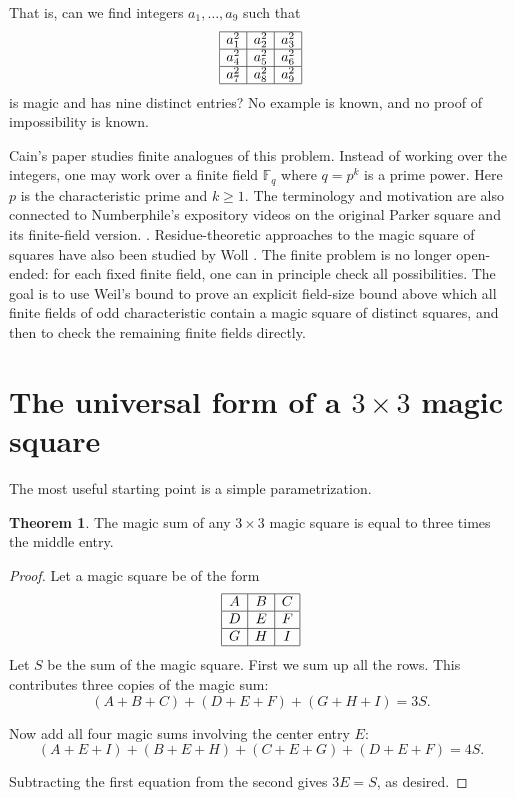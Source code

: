 \documentclass{article}
\newcommand{\F}{\mathbb F}
\theoremstyle{definition}
\newtheorem{theorem}{Theorem}
\numberwithin{equation}{section}
\begin{document}
That is, can we find integers \(a_1,\dots,a_9\) such that
\[
\begin{array}{|c|c|c|}
\hline
a_1^2&a_2^2&a_3^2\\
\hline
a_4^2&a_5^2&a_6^2\\
\hline
a_7^2&a_8^2&a_9^2 \\
\hline
\end{array}
\]
is magic and has nine distinct entries? No example is known, and no proof of
impossibility is known. \cite{guyUnsolvedProblems}

Cain's paper \cite{cain} studies finite analogues of this problem. Instead of
working over the integers, one may work over a finite field \(\F_q\) where \(q=p^k\) is a prime power. Here \(p\) is the characteristic prime and \(k\geq1\). The terminology and motivation are also connected to Numberphile’s
expository videos on the original Parker square and its finite-field version. \cite{numberphileParkerSquare, numberphileFiniteFields}. Residue-theoretic
approaches to the magic square of squares have also been studied by Woll \cite{wollResidue}. The finite problem is no longer open-ended: for each
fixed finite field, one can in principle check all possibilities.
The goal is to use Weil's bound to prove an explicit field-size bound above which all finite fields of odd characteristic contain a magic square of distinct squares, and then to check the remaining finite fields directly.

\section{The universal form of a \(3\times 3\) magic square}

The most useful starting point is a simple parametrization.

\begin{theorem}
The magic sum of any \(3\times 3\) magic square is equal to three times the middle entry. \label{magic_square_sum}
\end{theorem}
\begin{proof}
    Let a magic square be of the form
    \[
    \begin{array}{|c|c|c|}
    \hline
    A & B & C \\
    \hline
    D & E & F \\
    \hline
    G & H & I \\
    \hline
    \end{array}
    \]
    Let $S$ be the sum of the magic square. First we sum up all the rows. This contributes three copies of the magic sum:
\[
(A+B+C)+(D+E+F)+(G+H+I)=3S.
\]

    Now add all four magic sums involving the center entry \(E\):
\[
(A+E+I)+(B+E+H)+(C+E+G)+(D+E+F)=4S.
\]

    Subtracting the first equation from the second gives \(3E=S\), as desired.
\end{proof}
\end{document}
